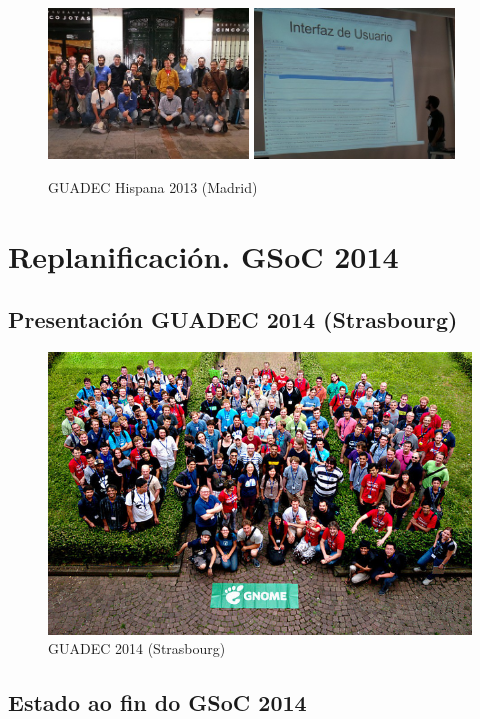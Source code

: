 \begin{figure}[h!]
    \centering
    \includegraphics[width=0.475\textwidth]{img/guadec_es_2013_1.jpg}
    \includegraphics[width=0.475\textwidth]{img/guadec_es_2013_2.jpg} 
    \caption{GUADEC Hispana 2013 (Madrid)}
    \label{fig:guadec2012}
\end{figure}

\section{Replanificación. GSoC 2014}

\subsection{Presentación GUADEC 2014 (Strasbourg)}

\begin{figure}[h!]
    \centering
    \includegraphics[width=\textwidth]{img/guadec_2014.jpg}
    \caption{GUADEC 2014 (Strasbourg)}
    \label{fig:guadec2012}
\end{figure}

\subsection{Estado ao fin do GSoC 2014}

